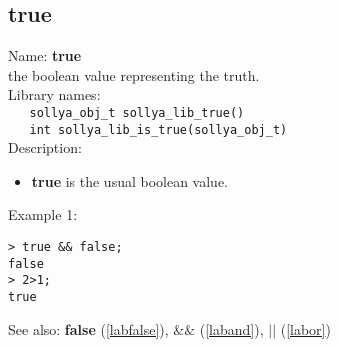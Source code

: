 \subsection{true}
\label{labtrue}
\noindent Name: \textbf{true}\\
\phantom{aaa}the boolean value representing the truth.\\[0.2cm]
\noindent Library names:\\
\verb|   sollya_obj_t sollya_lib_true()|\\
\verb|   int sollya_lib_is_true(sollya_obj_t)|\\[0.2cm]
\noindent Description: \begin{itemize}

\item \textbf{true} is the usual boolean value.
\end{itemize}
\noindent Example 1: 
\begin{center}\begin{minipage}{15cm}\begin{Verbatim}[frame=single]
> true && false;
false
> 2>1;
true
\end{Verbatim}
\end{minipage}\end{center}
See also: \textbf{false} (\ref{labfalse}), \textbf{$\&\&$} (\ref{laband}), \textbf{$||$} (\ref{labor})
